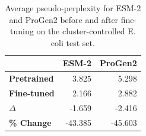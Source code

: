 \begin{table}[t]
\centering
\caption{Average pseudo-perplexity for ESM-2 and ProGen2 before and after fine-tuning on the cluster-controlled E. coli test set.}
\label{tab:ecoli_pseudoperplexity_cluster95}
\begin{tabular}{lrr}
\hline
 & \textbf{ESM-2} & \textbf{ProGen2} \\
\hline
\textbf{Pretrained} & 3.825 & 5.298 \\
\textbf{Fine-tuned} & 2.166 & 2.882 \\
\textbf{$\Delta$} & -1.659 & -2.416 \\
\textbf{\% Change} & -43.385 & -45.603 \\
\hline
\end{tabular}
\end{table}
